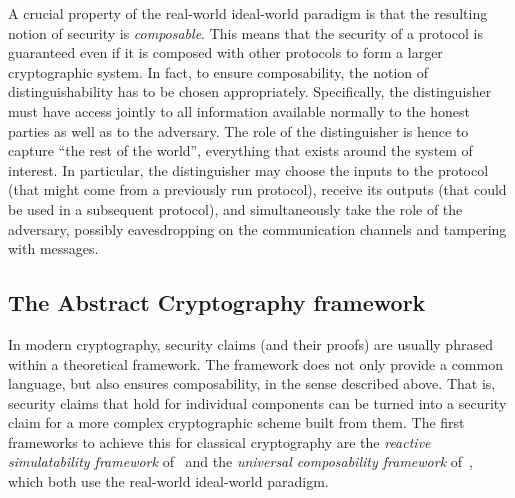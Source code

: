 A crucial property of the real-world ideal-world paradigm is that the resulting notion of security is \emph{composable}.  This means that the security of a protocol is guaranteed even if it is composed with other protocols to form a larger cryptographic system. In fact, to ensure composability,  the notion of distinguishability has to be chosen appropriately. Specifically, the distinguisher must have access jointly to
all information available normally to the honest parties as well as to the adversary. The role of the distinguisher is hence to capture ``the rest of the world'', everything that exists around the system of interest. In particular, the distinguisher may choose the inputs to the protocol (that might come from a previously run protocol), receive its outputs (that could be used in a subsequent protocol), and  simultaneously take the role of the adversary, possibly eavesdropping on the communication channels and tampering with messages. 



\subsection{The Abstract Cryptography framework}
\label{sec:ac.ac}

In modern cryptography, security claims (and their proofs) are usually
phrased within a theoretical framework. The framework does not only
provide a common language, but also ensures composability, in the
sense described above. That is, security claims that hold for
individual components can be turned into a security claim for a more
complex cryptographic scheme built from them. The first frameworks to
achieve this for classical cryptography are the \emph{reactive
  simulatability framework} of~\textcite{PW00,PW01} and the
\emph{universal composability framework} of~\textcite{Can01}, which
both use the real-world ideal-world paradigm.

